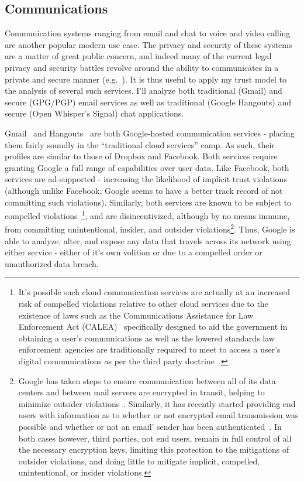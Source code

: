 \subsection{Communications}

Communication systems ranging from email and chat to voice and video
calling are another popular modern use case. The privacy and security
of these systems are a matter of great public concern, and indeed many
of the current legal privacy and security battles revolve around the
ability to communicates in a private and secure manner
(e.g.~\cite{apple-fbiletter, greenwald-prism, levsion-lavabit}). It is
thus useful to apply my trust model to the analysis of several such
services. I'll analyze both traditional (Gmail) and secure (GPG/PGP)
email services as well as traditional (Google Hangouts) and secure
(Open Whisper's Signal) chat applications.

Gmail~\cite{google-gmail} and Hangouts~\cite{google-hangouts} are both
Google-hosted communication services - placing them fairly soundly in
the ``traditional cloud services'' camp. As such, their profiles are
similar to those of Dropbox and Facebook. Both services require
granting Google a full range of capabilities over user data. Like
Facebook, both services are ad-supported - increasing the likelihood
of implicit trust violations (although unlike Facebook, Google seems
to have a better track record of not committing such
violations). Similarly, both services are known to be subject to
compelled violations~\cite{google-transparency}\footnote{It's possible
  such cloud communication services are actually at an increased risk
  of compelled violations relative to other cloud services due to the
  existence of laws such as the Communications Assistance for Law
  Enforcement Act (CALEA)~\cite{calea-usc, calea-fcc} specifically
  designed to aid the government in obtaining a user's communications
  as well as the lowered standards law enforcement agencies are
  traditionally required to meet to access a user's digital
  communications as per the third party
  doctrine~\cite{scotus-usvmiller, scotus-smithvmaryland}.}, and are
disincentivized, although by no means immune, from committing
unintentional, insider, and outsider violations\footnote{Google has
  taken steps to ensure communication between all of its data centers
  and between mail servers are encrypted in transit, helping to
  minimize outsider
  violations~\cite{gmail-blog-encryption}. Similarly, it has recently
  started providing end users with information as to whether or not
  encrypted email transmission was possible and whether or not an
  email' sender has been authenticated~\cite{gmail-blog-indicators}.
  In both cases however, third parties, not end users, remain in full
  control of all the necessary encryption keys, limiting this
  protection to the mitigations of outsider violations, and doing
  little to mitigate implicit, compelled, unintentional, or insider
  violations.}. Thus, Google is able to analyze, alter, and expose any
data that travels across its network using either service - either of
it's own volition or due to a compelled order or unauthorized data
breach.

